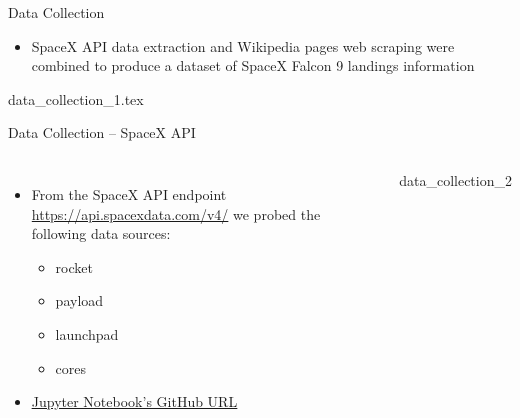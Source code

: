 \begin{frame}{Data Collection}
    \begin{itemize}
        \item SpaceX API data extraction and Wikipedia pages web scraping were combined to produce a dataset of SpaceX Falcon 9 landings information
    \end{itemize}
    {data_collection_1.tex}
\end{frame}

{\nologo
\begin{frame}{Data Collection -- SpaceX API}
    \begin{columns}
            \begin{itemize}
                \item From the SpaceX API endpoint \url{https://api.spacexdata.com/v4/} we probed the following data sources:
                \begin{itemize}
                    \item rocket
                    \item payload
                    \item launchpad
                    \item cores
                \end{itemize}
                \item \href{https://github.com/eyamrog/ibm_data_science/blob/main/10_Data_Science_Capstone_Lab1_Collecting_the_Data.ipynb}{\uline{Jupyter Notebook's GitHub URL}}
            \end{itemize}
            {data_collection_2}
    \end{columns}
\end{frame}
}

%
%

